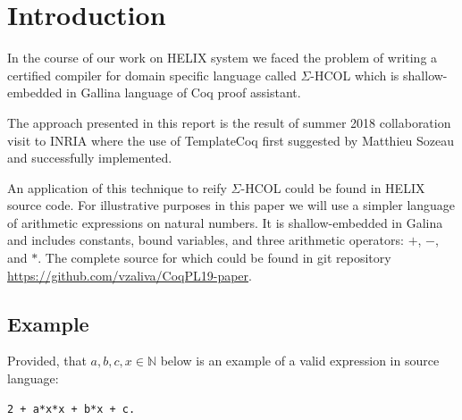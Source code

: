 \documentclass[sigplan]{acmart}\settopmatter{printfolios=true,printccs=false,printacmref=false}
\newcommand{\N}{\mathbb{N}}
\begin{document}


\maketitle

\section{Introduction}

In the course of our work on HELIX system\cite{helixFHPC18} we faced
the problem of writing a certified compiler for domain specific
language called $\Sigma$-HCOL which is shallow-embedded in Gallina
language of Coq\cite{Coq} proof assistant.

The approach presented in this report is the result of summer 2018
collaboration visit to INRIA where the use of
TemplateCoq\cite{anand2018towards} first suggested by Matthieu Sozeau
and successfully implemented.

An application of this technique to reify $\Sigma$-HCOL could be found
in HELIX source code. For illustrative purposes in this paper we will
use a simpler language of arithmetic expressions on natural
numbers. It is shallow-embedded in Galina and includes constants,
bound variables, and three arithmetic operators: $+$, $-$, and
$*$. The complete source for which could be found in git repository
\url{https://github.com/vzaliva/CoqPL19-paper}.

\subsection{Example}

Provided, that $a, b, c, x \in \N$ below is an example of a valid
expression in source language:

\begin{lstlisting}[language=Coq, mathescape=true,
  frame=single, basicstyle=\footnotesize,
  caption=Expression in source language,
  label=lst:sexp]
2 + a*x*x + b*x + c.
\end{lstlisting}
\end{document}
